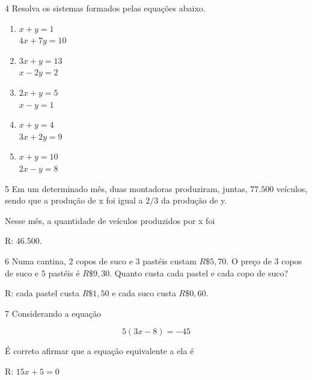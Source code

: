 
\num{4}  Resolva os sistemas formados pelas equações abaixo.

\begin{multicols}{3} 
\begin{enumerate}\def\labelenumi{\alph{enumi})}
\item $x + y = 1$\\
$4x + 7y = 10$

\item $3x + y = 13$\\
$x - 2y = 2$

\item $2x + y = 5$\\
$x - y = 1$

\item $x + y = 4$\\
$3x + 2y = 9$

\item $x + y = 10$\\
$2x - y = 8$
\end{enumerate}
\end{multicols}








\num{5}  Em um determinado mês, duas montadoras produziram, juntas, $77.500$
veículos, sendo que a produção de x foi igual a $2/3$ da produção de y.

Nesse mês, a quantidade de veículos produzidos por x foi

R: $46.500$.

\num{6}  Numa cantina, $2$ copos de suco e $3$ pastéis custam $R\$5,70$. O preço de
3 copos de suco e $5$ pastéis é $R\$9,30$. Quanto custa cada pastel e cada
copo de suco?

R: cada pastel custa $R\$1,50$ e cada suco custa $R\$0,60$.

\num{7}  Considerando a equação

$$5(3x - 8) = -45$$

É correto afirmar que a equação equivalente a ela é

R: $15x + 5 = 0$

